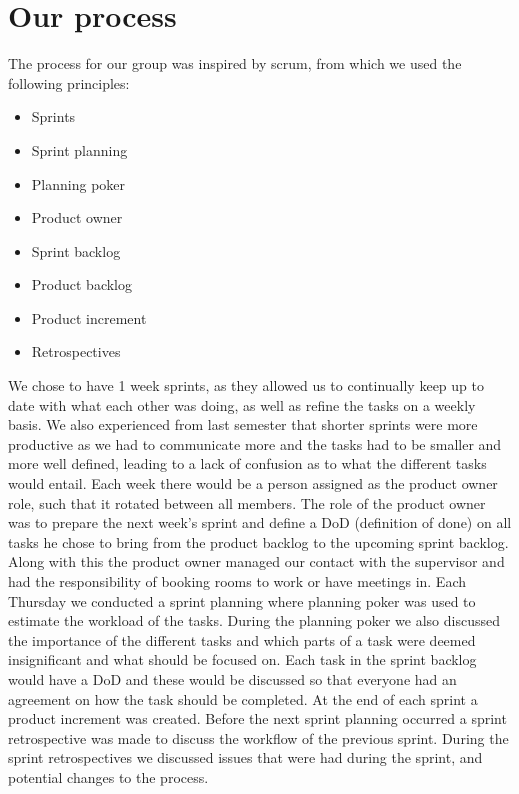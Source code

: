 \section{Our process}\label{sec:our-process}
The process for our group was inspired by scrum, from which we used the following principles:

\begin{itemize}
    \item Sprints 
    \item Sprint planning 
    \item Planning poker 
    \item Product owner 
    \item Sprint backlog 
    \item Product backlog   
    \item Product increment 
    \item Retrospectives 
\end{itemize}

\noindent
We chose to have 1 week sprints, as they allowed us to continually keep up to date with what each other was doing, as well as refine the tasks on a weekly basis.
We also experienced from last semester that shorter sprints were more productive as we had to communicate more and the tasks had to be smaller and more well defined, leading to a lack of confusion as to what the different tasks would entail.
Each week there would be a person assigned as the product owner role, such that it rotated between all members.
The role of the product owner was to prepare the next week's sprint and define a DoD (definition of done) on all tasks he chose to bring from the product backlog to the upcoming sprint backlog.
Along with this the product owner managed our contact with the supervisor and had the responsibility of booking rooms to work or have meetings in.
Each Thursday we conducted a sprint planning where planning poker was used to estimate the workload of the tasks.
During the planning poker we also discussed the importance of the different tasks and which parts of a task were deemed insignificant and what should be focused on.
Each task in the sprint backlog would have a DoD and these would be discussed so that everyone had an agreement on how the task should be completed.
At the end of each sprint a product increment was created. 
Before the next sprint planning occurred a sprint retrospective was made to discuss the workflow of the previous sprint.
During the sprint retrospectives we discussed issues that were had during the sprint, and potential changes to the process.
